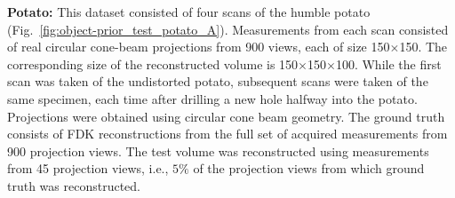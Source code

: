 \documentclass[journal]{IEEEtran}
\begin{document}

\textbf{Potato:} This dataset consisted of four scans of the humble potato (Fig.~\ref{fig:object-prior_test_potato_A}). Measurements from each scan consisted of real circular cone-beam projections from 900 views, each of size 150$\times$150. The corresponding size of the reconstructed volume is 150$\times$150$\times$100. While the first scan was taken of the undistorted potato, subsequent scans were taken of the same specimen, each time after drilling a new hole halfway into the potato.  Projections were obtained using circular cone beam geometry.  %
The ground truth consists of FDK reconstructions from the full set of acquired measurements from 900 projection views. The test volume was reconstructed using measurements from 45 projection views, i.e., $5\%$ of the projection views from which ground truth was reconstructed.
\end{document}
